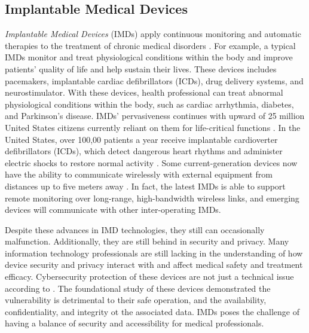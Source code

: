 \documentclass[pdf,bookmarks,colorlinks=true]{IEEEtran}
\begin{document}
\subsection{Implantable Medical Devices}
\emph{Implantable Medical Devices} (IMDs) apply continuous monitoring and automatic therapies to the treatment of chronic medical disorders \cite{Rostami:2013:HAI:2541806.2516658}. For example, a typical IMDs monitor and treat physiological conditions within the body and improve patients' quality of life and help sustain their lives.  These devices includes pacemakers, implantable cardiac defibrillators (ICDs), drug delivery systems, and neurostimulator. With these devices, health professional can treat abnormal physiological conditions within the body, such as cardiac arrhythmia, diabetes, and Parkinson's disease. IMDs' pervasiveness continues with upward of 25 million United States citizens currently reliant on them for life-critical functions \cite{halperin2008security}. In the United States, over 100,00 patients a year receive implantable cardioverter defibrillators (ICDs), which detect dangerous heart rhythms and administer electric shocks to restore normal activity \cite{Rostami:2013:HAI:2541806.2516658}. Some current-generation devices now have the ability to communicate wirelessly with external equipment from distances up to five meters away \cite{denning2010patients}. In fact, the latest IMDs is able to support remote monitoring over long-range, high-bandwidth wireless links, and emerging devices will communicate with other inter-operating IMDs. \par
Despite these advances in IMD technologies, they still can occasionally malfunction. Additionally, they are still behind in security and privacy. Many information technology professionals are still lacking in the understanding of how device security and privacy interact with and affect medical safety and treatment efficacy. Cybersecurity protection of these devices are not just a technical issue according to \cite{williams2015cybersecurity}. The foundational study of these devices demonstrated the vulnerability is detrimental to their safe operation, and the availability, confidentiality, and integrity ot the associated data. IMDs poses the challenge of having a balance of security and accessibility for medical professionals.	
\end{document}
